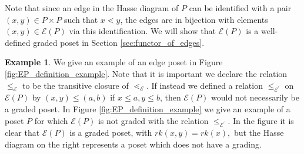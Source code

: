 \documentclass[10 pt]{amsart}
\theoremstyle{plain}
\theoremstyle{definition}
\newtheorem{eg}[thm]{Example}
\theoremstyle{remark}
\numberwithin{equation}{section}
\begin{document}
Note that since an edge in the Hasse diagram of $P$ can be identified with a pair $(x,y)\in P\times P$ such that $x\lessdot y$, the edges are in bijection with elements $(x,y)\in \mathcal E(P)$ via this identification.  We will show that $\mathcal{E}(P)$ is a well-defined graded poset in Section \ref{sec:functor_of_edges}. 

\begin{eg}
We give an example of an edge poset in Figure \ref{fig:EP_definition_example}.  Note that it is important we declare the relation $\leq_\mathcal E$ to be the transitive closure of $\lessdot_{\mathcal E}$.  If instead we defined a relation $\le_{\mathcal{E^\prime}}$ on $\mathcal{E}(P)$ by $(x, y) \leq (a, b)$ if $x \leq a, y \leq b$, then $\mathcal{E}(P)$ would not necessarily be a graded poset.  In Figure \ref{fig:EP_definition_example} we give an example of a poset $P$ for which $\mathcal{E}(P)$ is not graded with the relation $\le_{\mathcal{E^\prime}}$.  In the figure it is clear that $\mathcal E(P)$ is a graded poset, with $rk(x,y) = rk(x),$ but the Hasse diagram on the right represents a poset which does not have a grading.




\end{eg}
\end{document}
